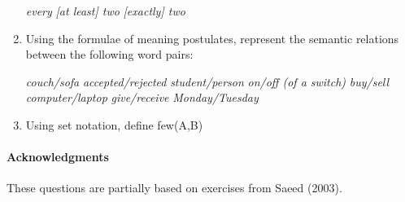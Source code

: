 \documentclass[a4paper]{article}
\begin{document}
\begin{enumerate}
\begin{exe}
    \ex \textit{every }
    \ex \textit{{[at least]} two}
    \ex \textit{{[exactly]} two}
  \end{exe}
\item Using the formulae of meaning postulates, represent the
  semantic relations between the following word pairs:
  \begin{exe}
    \ex \textit{couch/sofa}
    \ex \textit{accepted/rejected}
    \ex \textit{student/person}
    \ex \textit{on/off (of a switch)}
    \ex \textit{buy/sell}
    \ex \textit{computer/laptop}
    \ex \textit{give/receive}
    \ex \textit{Monday/Tuesday}
  \end{exe}
\item Using set notation, define \textup{few(A,B)}
\end{enumerate}
\vfill
\paragraph{Acknowledgments} These questions are partially
based on exercises from Saeed (2003).
\end{document}
